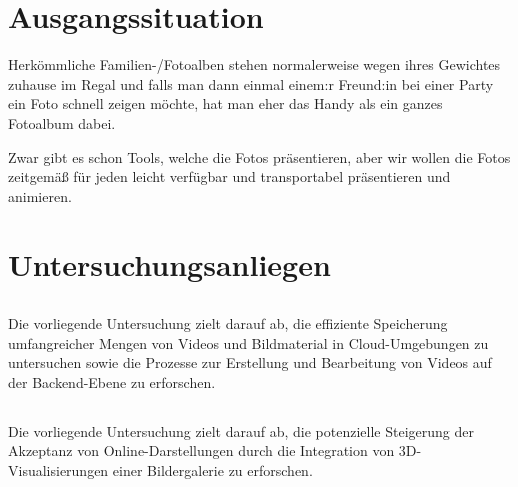 \newpage

\section{Ausgangssituation}

Herkömmliche Familien-/Fotoalben stehen normalerweise wegen ihres Gewichtes 
zuhause im Regal und falls man dann einmal einem:r Freund:in bei einer Party ein Foto schnell 
zeigen möchte, hat man eher das Handy als ein ganzes Fotoalbum dabei.

Zwar gibt es schon Tools, welche die Fotos präsentieren, aber wir wollen die Fotos 
zeitgemä\ss{} für jeden leicht verfügbar und transportabel präsentieren und animieren.

\section{Untersuchungsanliegen}

\subsection{\firstauthor}

Die vorliegende Untersuchung zielt darauf ab, die effiziente Speicherung 
umfangreicher Mengen von Videos und Bildmaterial in Cloud-Umgebungen zu 
untersuchen sowie die Prozesse zur Erstellung und Bearbeitung von Videos 
auf der Backend-Ebene zu erforschen.

\subsection{\secondauthor}

Die vorliegende Untersuchung zielt darauf ab, die potenzielle Steigerung 
der Akzeptanz von Online-Darstellungen durch die Integration von 
3D-Visualisierungen einer Bildergalerie zu erforschen.

